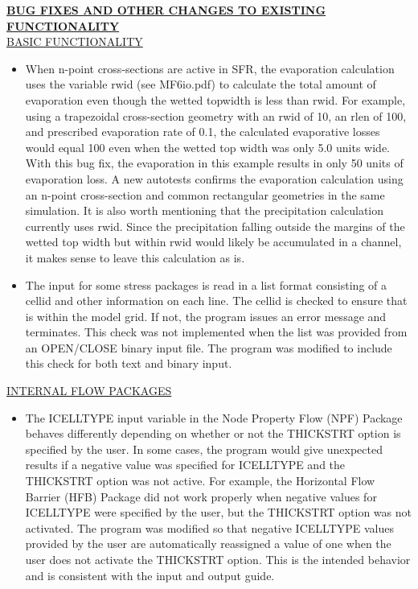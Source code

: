 
	\textbf{\underline{BUG FIXES AND OTHER CHANGES TO EXISTING FUNCTIONALITY}} \\
	\underline{BASIC FUNCTIONALITY}
	\begin{itemize}
		\item When n-point cross-sections are active in SFR, the evaporation calculation uses the variable rwid (see MF6io.pdf) to calculate the total amount of evaporation even though the wetted topwidth is less than rwid.  For example, using a trapezoidal cross-section geometry with an rwid of 10, an rlen of 100, and prescribed evaporation rate of 0.1, the calculated evaporative losses would equal 100 even when the wetted top width was only 5.0 units wide.  With this bug fix, the evaporation in this example results in only 50 units of evaporation loss.  A new autotests confirms the evaporation calculation using an n-point cross-section and common rectangular geometries in the same simulation.  It is also worth mentioning that the precipitation calculation currently uses rwid.  Since the precipitation falling outside the margins of the wetted top width but within rwid would likely be accumulated in a channel, it makes sense to leave this calculation as is.
		\item The input for some stress packages is read in a list format consisting of a cellid and other information on each line.  The cellid is checked to ensure that is within the model grid.  If not, the program issues an error message and terminates.  This check was not implemented when the list was provided from an OPEN/CLOSE binary input file.  The program was modified to include this check for both text and binary input.
	\end{itemize}

	\underline{INTERNAL FLOW PACKAGES}
	\begin{itemize}
		\item The ICELLTYPE input variable in the Node Property Flow (NPF) Package behaves differently depending on whether or not the THICKSTRT option is specified by the user.  In some cases, the program would give unexpected results if a negative value was specified for ICELLTYPE and the THICKSTRT option was not active.  For example, the Horizontal Flow Barrier (HFB) Package did not work properly when negative values for ICELLTYPE were specified by the user, but the THICKSTRT option was not activated.  The program was modified so that negative ICELLTYPE values provided by the user are automatically reassigned a value of one when the user does not activate the THICKSTRT option.  This is the intended behavior and is consistent with the input and output guide.   
	\end{itemize}


